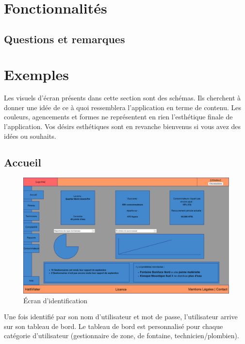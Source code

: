 \documentclass[a4paper, 11pt]{article}
\begin{document}
\section{Fonctionnalités}
  \subsection{Questions et remarques}
\section{Exemples}
  \begin{shaded}
    Les visuels d'écran présents dans cette section sont des schémas. Ils cherchent à donner une idée de ce à quoi ressemblera l'application en terme de contenu. Les couleurs, agencements et formes ne représentent en rien l'esthétique finale de l'application. Vos désirs esthétiques sont en revanche bienvenus si vous avez des idées ou souhaits.
  \end{shaded}

  \subsection{Accueil}

    \begin{figure}[H]
        \includegraphics[width=\textwidth]{Cahier_des_Charges/accueil}
        \caption{\'Ecran d'identification}
        \label{fig:zone_dashboard}
    \end{figure}

    Une fois identifié par son nom d'utilisateur et mot de passe, l'utilisateur arrive sur son tableau de bord. Le tableau de bord est personnalisé pour chaque catégorie d'utilisateur (gestionnaire de zone, de fontaine, technicien/plombien).
\end{document}
